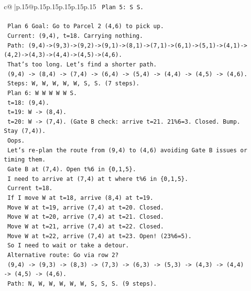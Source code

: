 \documentclass{article}
\begin{document}
{\begin{supertabular}{c@{$\;$}|p{.15\linewidth}@{}p{.15\linewidth}p{.15\linewidth}p{.15\linewidth}p{.15\linewidth}p{.15\linewidth}}
{{{\texttt{    Plan 5: S S.} \\
\\ 
\texttt{    Plan 6 Goal: Go to Parcel 2 (4,6) to pick up.} \\
\texttt{    Current: (9,4), t=18. Carrying nothing.} \\
\texttt{    Path: (9,4){-}>(9,3){-}>(9,2){-}>(9,1){-}>(8,1){-}>(7,1){-}>(6,1){-}>(5,1){-}>(4,1){-}>(4,2){-}>(4,3){-}>(4,4){-}>(4,5){-}>(4,6).} \\
\texttt{    That's too long. Let's find a shorter path.} \\
\texttt{    (9,4) {-}> (8,4) {-}> (7,4) {-}> (6,4) {-}> (5,4) {-}> (4,4) {-}> (4,5) {-}> (4,6).} \\
\texttt{    Steps: W, W, W, W, W, S, S. (7 steps).} \\
\texttt{    Plan 6: W W W W W S.} \\
\texttt{    t=18: (9,4).} \\
\texttt{    t=19: W {-}> (8,4).} \\
\texttt{    t=20: W {-}> (7,4). (Gate B check: arrive t=21. 21\%6=3. Closed. Bump. Stay (7,4)).} \\
\texttt{    Oops.} \\
\texttt{    Let's re{-}plan the route from (9,4) to (4,6) avoiding Gate B issues or timing them.} \\
\texttt{    Gate B at (7,4). Open t\%6 in \{0,1,5\}.} \\
\texttt{    I need to arrive at (7,4) at t where t\%6 in \{0,1,5\}.} \\
\texttt{    Current t=18.} \\
\texttt{    If I move W at t=18, arrive (8,4) at t=19.} \\
\texttt{    Move W at t=19, arrive (7,4) at t=20. Closed.} \\
\texttt{    Move W at t=20, arrive (7,4) at t=21. Closed.} \\
\texttt{    Move W at t=21, arrive (7,4) at t=22. Closed.} \\
\texttt{    Move W at t=22, arrive (7,4) at t=23. Open! (23\%6=5).} \\
\texttt{    So I need to wait or take a detour.} \\
\texttt{    Alternative route: Go via row 2?} \\
\texttt{    (9,4) {-}> (9,3) {-}> (8,3) {-}> (7,3) {-}> (6,3) {-}> (5,3) {-}> (4,3) {-}> (4,4) {-}> (4,5) {-}> (4,6).} \\
\texttt{    Path: N, W, W, W, W, W, S, S, S. (9 steps).} \\
}}}
\end{supertabular}}
\end{document}
